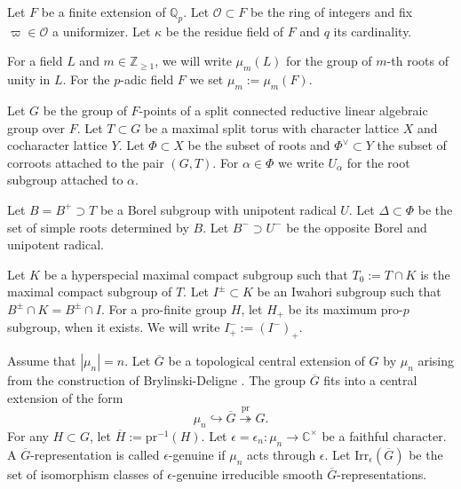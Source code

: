 \documentclass[11pt]{amsart}
\theoremstyle{plain}
\theoremstyle{definition}
\numberwithin{equation}{section}
\newcommand{\C}{\mathbb{C}}
\newcommand{\Q}{\mathbb{Q}}
\newcommand{\Z}{\mathbb{Z}}
\newcommand{\Gt}{\overline{G}}
\newcommand{\Gbb}{{\mathbb{G}}}
\newcommand{\Ocal}{\mathcal{O}}
\begin{document}





Let $F$ be a finite extension of $\Q_{p}$. Let $\Ocal\subset F$ be the ring of integers and fix $\varpi\in\Ocal$ a uniformizer. Let $\kappa$ be the residue field of $F$ and $q$ its cardinality. 

For a field $L$ and $m\in\Z_{\geq 1}$, we will write $\mu_{m}(L)$ for the group of $m$-th roots of unity in $L$. For the $p$-adic field $F$ we set $\mu_{m}:=\mu_{m}(F)$. 


Let $G$ be the group of $F$-points of a split connected reductive linear algebraic group over $F$. Let $T\subset G$ be a maximal split torus with character lattice $X$ and cocharacter lattice $Y$. Let $\Phi\subset X$ be the subset of roots and $\Phi^{\vee}\subset Y$ the subset of corroots attached to the pair $(G,T)$. For $\alpha\in\Phi$ we write $U_{\alpha}$ for the root subgroup attached to $\alpha$.

Let $B=B^{+}\supset T$ be a Borel subgroup with unipotent radical $U$. Let $\Delta\subset\Phi$ be the set of simple roots determined by $B$. Let $B^{-}\supset U^{-}$ be the opposite Borel and unipotent radical.

Let $K$ be a hyperspecial maximal compact subgroup such that $T_{0}:=T\cap K$ is the maximal compact subgroup of $T$. Let $I^{\pm}\subset K$ be an Iwahori subgroup such that $B^{\pm}\cap K = B^{\pm}\cap I$. For a pro-finite group $H$, let $H_{+}$ be its maximum pro-$p$ subgroup, when it exists. We will write $I^{-}_{+}:=(I^{-})_{+}$.

Assume that $|\mu_{n}|=n$. Let $\Gt$ be a topological central extension of $G$ by $\mu_{n}$ arising from the construction of Brylinski-Deligne \cite{BD01}. The group $\Gt$ fits into a central extension of the form
\begin{equation}\label{Eqn:CExt}
    \mu_{n}\hookrightarrow \Gt\stackrel{\mathrm{pr}}{\twoheadrightarrow} G.
\end{equation}
For any $H\subset G$, let $\overline{H}:=\mathrm{pr}^{-1}(H)$. Let $\epsilon=\epsilon_{n}:\mu_{n}\rightarrow \C^{\times}$ be a faithful character. A $\Gt$-representation is called $\epsilon$-genuine if $\mu_{n}$ acts through $\epsilon$. Let $\mathrm{Irr}_{\epsilon}(\Gt)$ be the set of isomorphism classes of $\epsilon$-genuine irreducible smooth $\Gt$-representations.
\end{document}

